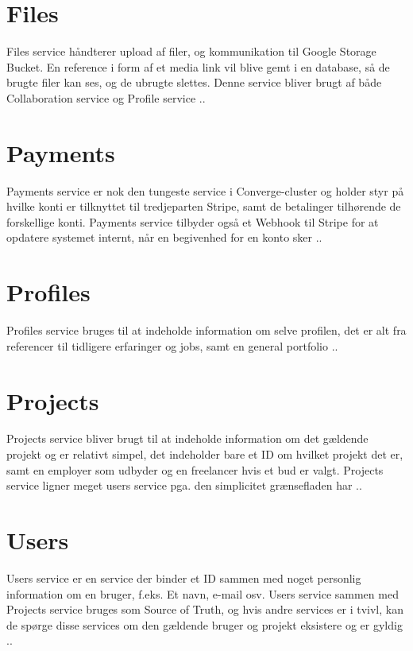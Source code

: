 \section{Files}
\label{sec:files-service}

Files service håndterer upload af filer, og kommunikation til Google Storage Bucket. En reference i form af et media link vil blive gemt i en database, så de brugte filer kan ses, og de ubrugte slettes. Denne service bliver brugt af både Collaboration  service og Profile service \cite[Files-Service]{uml-diagrams}..

\section{Payments}
\label{sec:payments-service}

Payments service er nok den tungeste service i Converge-cluster og holder styr på hvilke konti er tilknyttet til tredjeparten Stripe, samt de betalinger tilhørende de forskellige konti. Payments service tilbyder også et Webhook til Stripe for at opdatere systemet internt, når en begivenhed for en konto sker \cite[Payments-Service]{uml-diagrams}..

\section{Profiles}
\label{sec:profiles-service}

Profiles service bruges til at indeholde information om selve profilen, det er alt fra referencer til tidligere erfaringer og jobs, samt en general portfolio \cite[Profile-Service]{uml-diagrams}..

\section{Projects}
\label{sec:projects-service}

Projects service bliver brugt til at indeholde information om det gældende projekt og er relativt simpel, det indeholder bare et ID om hvilket projekt det er, samt en employer som udbyder og en freelancer hvis et bud er valgt. Projects service ligner meget users service   pga. den simplicitet grænsefladen har \cite[Projects-Service]{uml-diagrams}..

\section{Users}
\label{sec:users-service}

Users service er en service der binder et ID sammen med noget personlig information om en bruger, f.eks. Et navn, e-mail osv. Users service sammen med Projects service bruges som Source of Truth, og hvis andre services er i tvivl, kan de spørge disse services om den gældende bruger og projekt eksistere og er gyldig \cite[Users-Service]{uml-diagrams}..

